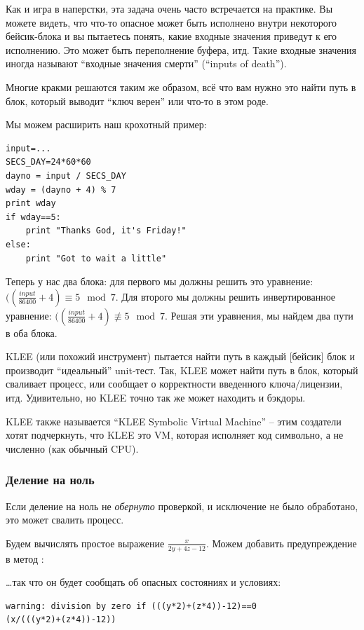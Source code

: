 Как и игра в наперстки, эта задача очень часто встречается на практике.
Вы можете видеть, что что-то опасное может быть исполнено внутри некоторого бейсик-блока и вы пытаетесь понять,
какие входные значения приведут к его исполнению.
Это может быть переполнение буфера, итд.
Такие входные значения иногда называют ``входные значения смерти'' (``inputs of death'').

Многие кракми решаются таким же образом, всё что вам нужно это найти путь в блок, который выводит ``ключ верен''
или что-то в этом роде.

Мы можем расширить наш крохотный пример:

\begin{lstlisting}
input=...
SECS_DAY=24*60*60
dayno = input / SECS_DAY
wday = (dayno + 4) % 7
print wday
if wday==5:
    print "Thanks God, it's Friday!"
else:
    print "Got to wait a little"
\end{lstlisting}

Теперь у нас два блока: для первого мы должны решить это уравнение: $((\frac{input}{86400}+4) \equiv 5 \mod 7$.
Для второго мы должны решить инвертированное уравнение: $((\frac{input}{86400}+4) \not\equiv 5 \mod 7$.
Решая эти уравнения, мы найдем два пути в оба блока.

KLEE (или похожий инструмент) пытается найти путь в каждый [бейсик] блок и производит ``идеальный'' unit-тест.
Так, KLEE может найти путь в блок, который сваливает процесс, или сообщает о корректности введенного ключа/лицензии, итд.
Удивительно, но KLEE точно так же может находить и бэкдоры.

KLEE также называется ``KLEE Symbolic Virtual Machine'' -- этим создатели хотят подчеркнуть, что KLEE это \ac{VM},
которая исполняет код символьно, а не численно (как обычный \ac{CPU}).

\subsubsection{Деление на ноль}

Если деление на ноль не \textit{обернуто} проверкой, и исключение не было обработано, это может свалить процесс.

Будем вычислять простое выражение $\frac{x}{2y + 4z - 12}$.
Можем добавить предупреждение в метод :



\dots так что он будет сообщать об опасных состояниях и условиях:

\begin{lstlisting}
warning: division by zero if (((y*2)+(z*4))-12)==0
(x/(((y*2)+(z*4))-12))
\end{lstlisting}

